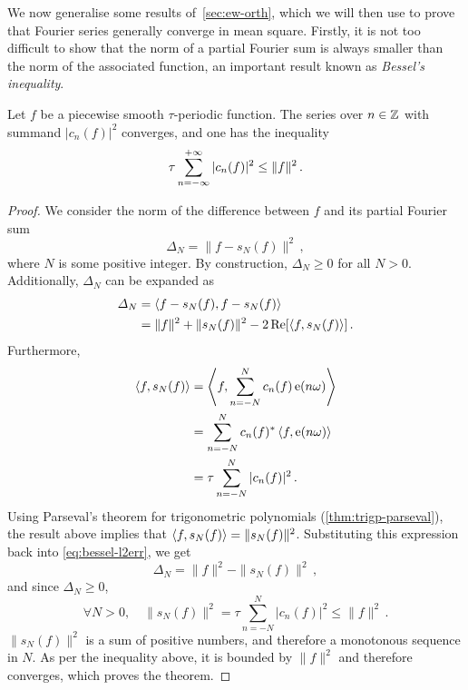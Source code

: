 We now generalise some results of~\cref{sec:ew-orth}, which we will then use to prove
that Fourier series generally converge in mean square. Firstly, it is not too difficult
to show that the norm of a partial Fourier sum is always smaller than the norm of the
associated function, an important result known as \emph{Bessel's inequality}.
\begin{theorem}
	\label{thm:bessel}
	Let $f$ be a piecewise smooth $\tau$-periodic function. The series over $n\in\mathbb{Z}$ with
	summand $|c_n(f)|^2$ converges, and one has the inequality
	\begin{equation}
		\tau\sum_{n=-\infty}^{+\infty}|c_n(f)|^2\leq\|f\|^2\,.
	\end{equation}
\end{theorem}
\begin{proof}
	We consider the norm of the difference between $f$ and its partial Fourier sum
	\begin{equation}
		\Delta_N=\|f-s_N(f)\|^2\,,
	\end{equation}
	where $N$ is some positive integer. By construction, $\Delta_N\geq 0$ for all $N>0$.
	Additionally, $\Delta_N$ can be expanded as
	\begin{align}
		\Delta_N & =\braket{f-s_N(f),f-s_N(f)}                                             \\
		         & =\|f\|^2+\|s_N(f)\|^2-2\operatorname{Re}[\braket{f,s_N(f)}]\,.\label{eq:bessel-l2err}
	\end{align}
	Furthermore,
	\begin{align}
		\braket{f,s_N(f)} & =\Braket{f,\sum_{n=-N}^{N}c_n(f)\operatorname{e}(n\omega)}   \\
		                  & =\sum_{n=-N}^{N}c_n(f)^*\braket{f,\operatorname{e}(n\omega)} \\
		                  & =\tau\sum_{n=-N}^{N}|c_n(f)|^2\,.
	\end{align}
	Using Parseval's theorem for trigonometric polynomials (\cref{thm:trigp-parseval}), the
	result above implies that $\braket{f,s_N(f)}=\|s_N(f)\|^2$. Substituting this expression
	back into \cref{eq:bessel-l2err}, we get
	\begin{equation}
		\Delta_N=\|f\|^2-\|s_N(f)\|^2\,,
	\end{equation}
	and since $\Delta_N\geq 0$,
	\begin{equation}
		\forall N>0,\quad \|s_N(f)\|^2=\tau\sum_{n=-N}^{N}|c_n(f)|^2\leq \|f\|^2\,.
	\end{equation}
	$\|s_N(f)\|^2$ is a sum of positive numbers, and therefore a monotonous sequence in $N$.
	As per the inequality above, it is bounded by $\|f\|^2$ and therefore converges, which
	proves the theorem.
\end{proof}
